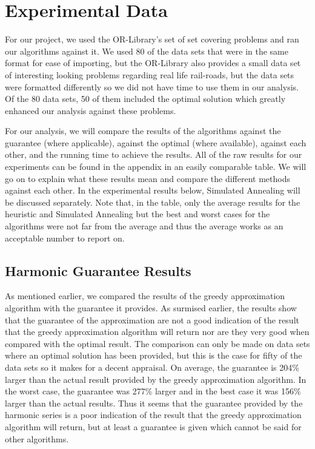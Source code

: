\documentclass{report}
\begin{document}
\section{Experimental Data}
For our project, we used the OR-Library's set of set covering problems and ran our algorithms against it. We used 80 of the data sets that were in the same format for ease of importing, but the OR-Library also provides a small data set of interesting looking problems regarding real life rail-roads, but the data sets were formatted differently so we did not have time to use them in our analysis. Of the 80 data sets, 50 of them included the optimal solution which greatly enhanced our analysis against these problems. 

For our analysis, we will compare the results of the algorithms against the guarantee (where applicable), against the optimal (where available), against each other, and the running time to achieve the results. All of the raw results for our experiments can be found in the appendix in an easily comparable table. We will go on to explain what these results mean and compare the different methods against each other. In the experimental results below, Simulated Annealing will be discussed separately. Note that, in the table, only the average results for the heuristic and Simulated Annealing but the best and worst cases for the algorithms were not far from the average and thus the average works as an acceptable number to report on.

\subsection{Harmonic Guarantee Results}
As mentioned earlier, we compared the results of the greedy approximation algorithm with the guarantee it provides. As surmised earlier, the results show that the guarantee of the approximation are not a good indication of the result that the greedy approximation algorithm will return nor are they very good when compared with the optimal result. The comparison can only be made on data sets where an optimal solution has been provided, but this is the case for fifty of the data sets so it makes for a decent appraisal. On average, the guarantee is 204\% larger than the actual result provided by the greedy approximation algorithm. In the worst case, the guarantee was 277\% larger and in the best case it was 156\% larger than the actual results. Thus it seems that the guarantee provided by the harmonic series is a poor indication of the result that the greedy approximation algorithm will return, but at least a guarantee is given which cannot be said for other algorithms.
\end{document}
